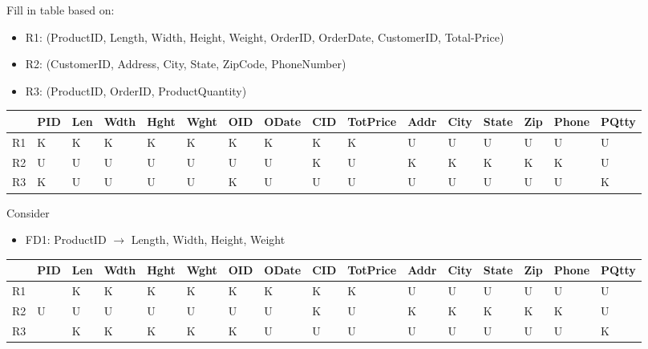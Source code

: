 \documentclass[a4paper]{article}
\begin{document}
Fill in table based on:
\begin{itemize}
    \item R1: (ProductID, Length, Width, Height, Weight, OrderID, OrderDate, CustomerID, Total-Price)
    \item R2: (CustomerID, Address, City, State, ZipCode, PhoneNumber)
    \item R3: (ProductID, OrderID, ProductQuantity)
\end{itemize}

\begin{table}[htb]
\begin{tabular}{|l|l|l|l|l|l|l|l|l|l|l|l|l|l|l|l|}
\hline
   & PID & Len & Wdth & Hght & Wght & OID & ODate & CID & TotPrice & Addr & City & State & Zip & Phone & PQtty \\ \hline
R1 & K   & K   & K    & K    & K    & K   & K     & K   & K        & U    & U    & U     & U   & U     & U     \\ \hline
R2 & U   & U   & U    & U    & U    & U   & U     & K   & U        & K    & K    & K     & K   & K     & U     \\ \hline
R3 & K   & U   & U    & U    & U    & K   & U     & U   & U        & U    & U    & U     & U   & U     & K     \\ \hline
\end{tabular}
\end{table}

Consider
\begin{itemize}
    \item FD1: ProductID $\rightarrow$ Length, Width, Height, Weight
\end{itemize}


\begin{table}[htb]
\begin{tabular}{|l|l|l|l|l|l|l|l|l|l|l|l|l|l|l|l|}
\hline
   & PID                                              & Len                      & Wdth                     & Hght                     & Wght                     & OID & ODate & CID & TotPrice & Addr & City & State & Zip & Phone & PQtty \\ \hline
R1 & \cellcolor[HTML]{FFFC9E}{\color[HTML]{FE0000} K} & K                        & K                        & K                        & K                        & K   & K     & K   & K        & U    & U    & U     & U   & U     & U     \\ \hline
R2 & U                                                & U                        & U                        & U                        & U                        & U   & U     & K   & U        & K    & K    & K     & K   & K     & U     \\ \hline
R3 & \cellcolor[HTML]{FFFC9E}{\color[HTML]{FE0000} K} & {\color[HTML]{FE0000} K} & {\color[HTML]{FE0000} K} & {\color[HTML]{FE0000} K} & {\color[HTML]{FE0000} K} & K   & U     & U   & U        & U    & U    & U     & U   & U     & K     \\ \hline
\end{tabular}
\end{table}
\end{document}
